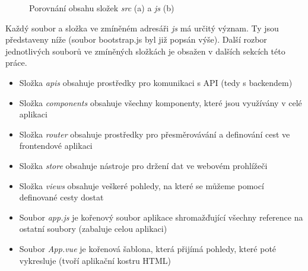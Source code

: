 	\begin{figure}[h]
		\centering
		\qquad
		\caption{Porovnání obsahu složek \textit{src} (a) a \textit{js} (b)}
		\label{fig:zdroj_kod_vue_rozdily}
	\end{figure}

	Každý soubor a složka ve zmíněném adresáři \textit{js} má určitý význam. Ty jsou představeny níže (soubor bootstrap.js byl již popsán výše). Další rozbor jednotlivých souborů ve zmíněných složkách je obsažen v dalších sekcích této práce.
	\begin{itemize}
		\item Složka \textit{apis} obsahuje prostředky pro komunikaci s API (tedy s backendem)
		\item Složka \textit{components} obsahuje všechny komponenty, které jsou využívány v celé aplikaci
		\item Složka \textit{router} obsahuje prostředky pro přesměrovávání a definování cest ve frontendové aplikaci
		\item Složka \textit{store} obsahuje nástroje pro držení dat ve webovém prohlížeči
		\item Složka \textit{views} obsahuje veškeré pohledy, na které se můžeme pomocí definované cesty dostat
		\item Soubor \textit{app.js} je kořenový soubor aplikace shromažďující všechny reference na ostatní soubory (zabaluje celou aplikaci)
		\item Soubor \textit{App.vue} je kořenová šablona, která přijímá pohledy, které poté vykresluje (tvoří aplikační kostru HTML)
	\end{itemize}
	
